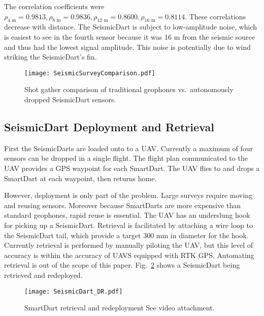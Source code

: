 The correlation coefficients were $\rho_{\text{4 m}}  =  0.9813, \rho_{\text{8 m}}  =  0.9836, \rho_{\text{12 m}}  =  0.8600, \rho_{\text{16 m}}  = 0.8114$. These correlations decrease with distance. The SeismicDart is subject to low-amplitude noise, which is easiest to see in the fourth sensor because it was 16 m from the seismic source and thus had the lowest signal amplitude.  This noise is potentially due to wind striking the SeismicDart's fin.



\begin{figure} \centering
  {\texttt{[image: SeismicSurveyComparison.pdf]}}
 \caption{Shot gather comparison of traditional geophones vs.\ autonomously dropped SeismicDart sensors.  
 \label{fig:shotgather_auto_drop}}
\end{figure}

\subsection{SeismicDart Deployment and Retrieval}
First the SeismicDarts are loaded onto to a UAV. 
Currently a maximum of four sensors can be dropped in a single flight. 
The flight plan communicated to the UAV provides a GPS waypoint for each SmartDart. 
The UAV flies to and drops a SmartDart at each waypoint, then returns home. 

However, deployment is only part of the problem. Large surveys require moving and reusing sensors.  
Moreover because SmartDarts are more expensive than standard geophones, rapid reuse is essential.
The UAV has an underslung hook for picking up a SeismicDart.
Retrieval is facilitated by attaching a wire loop to the SeismicDart tail, which provide a target 300 mm in diameter for the hook.
Currently retrieval is performed by manually piloting the UAV, but this level of accuracy is within the accuracy of UAVS equipped with RTK GPS.
Automating retrieval is out of the scope of this paper.
Fig.~\ref{fig:SeismicDart_DR} shows a SeismicDart being retrieved and redeployed.


\begin{figure} \centering
  {\texttt{[image: SeismicDart\_DR.pdf]}}
 \caption{SmartDart retrieval and redeployment  See video attachment. 
 \label{fig:SeismicDart_DR}}
\end{figure}
 